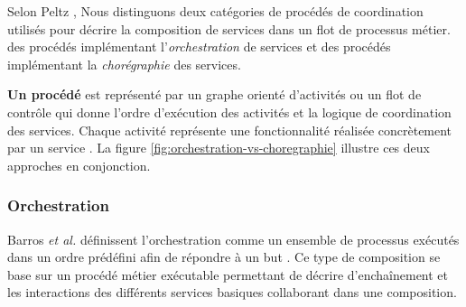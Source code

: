       Selon Peltz \cite{peltz2003web}, Nous distinguons deux
      catégories de procédés de coordination utilisés pour décrire la
      composition de services dans un flot de processus métier. des
      procédés implémentant l'\emph{orchestration} de services et des
      procédés implémentant la \emph{chorégraphie} des services.


      

      \textbf{Un procédé} est représenté par un graphe orienté
      d'activités ou un flot de contrôle qui donne l'ordre d'exécution
      des activités et la logique de coordination des services. Chaque
      activité représente une fonctionnalité réalisée concrètement par
      un service \cite{chollet2009orchestration}. La figure
      \ref{fig:orchestration-vs-choregraphie} illustre ces deux
      approches en conjonction.


        \subsubsection{Orchestration}
        \label{sec:orchestration}
        Barros \emph{et al.} \cite{barros2006standards} définissent
        l'orchestration comme un ensemble de processus exécutés dans
        un ordre prédéfini afin de répondre à un but
        \cite{lopez2008selection}. Ce type de composition se base sur
        un procédé métier exécutable permettant de décrire
        d'enchaînement et les interactions des différents services
        basiques collaborant dans une composition.

